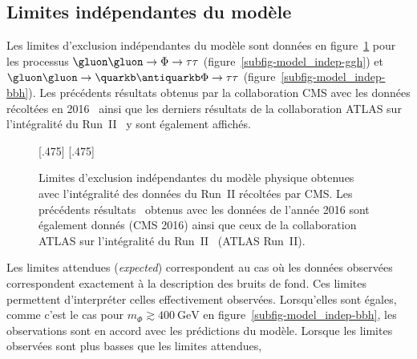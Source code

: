\subsection{Limites indépendantes du modèle}
Les limites d'exclusion indépendantes du modèle sont données en figure~\ref{fig-model_indep}
pour les processus
$\gluon\gluon\to\Phi\to\tau\tau$ (figure~\ref{subfig-model_indep-ggh})
et
$\gluon\gluon\to\quarkb\antiquarkb\Phi\to\tau\tau$ (figure~\ref{subfig-model_indep-bbh}).
Les précédents résultats obtenus par la collaboration CMS avec les données récoltées en 2016~\cite{CMS-PAS-HIG-17-020}
ainsi que les derniers résultats de la collaboration ATLAS sur l'intégralité du Run~II~\cite{ATLAS-MSSM-HTT_2020} y sont également affichés.
\begin{figure}[h]
\centering

[.475\textwidth]
{}
\hfill
{}[.475\textwidth]
{}


\caption[Limites d'exclusion indépendantes.]{Limites d'exclusion indépendantes du modèle physique obtenues avec l'intégralité des données du Run~II récoltées par CMS. Les précédents résultats~\cite{CMS-PAS-HIG-17-020} obtenus avec les données de l'année 2016 sont également donnés (CMS 2016) ainsi que ceux de la collaboration ATLAS sur l'intégralité du Run~II~\cite{ATLAS-MSSM-HTT_2020} (ATLAS Run~II).}
\label{fig-model_indep}
\end{figure}
\par
Les limites attendues (\emph{expected}) correspondent au cas où
les données observées correspondent exactement à la description des bruits de fond.
Ces limites permettent d'interpréter celles effectivement observées.
Lorsqu'elles sont égales,
comme c'est le cas pour $m_{\Phi}\gtrsim\SI{400}{\GeV}$ en figure~\ref{subfig-model_indep-bbh},
les observations sont en accord avec les prédictions du modèle.
Lorsque les limites observées sont plus basses que les limites attendues,
